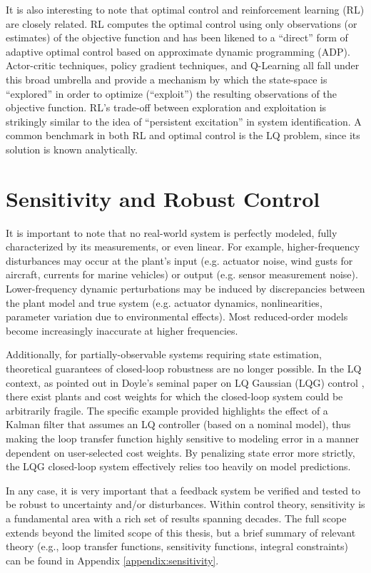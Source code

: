 It is also interesting to note that optimal control and reinforcement learning (RL) are closely related.  RL computes the optimal control using only observations (or estimates) of the objective function and has been likened to a ``direct'' \cite{slotineli} form of adaptive optimal control \cite{sutton1992reinforcement} based on approximate dynamic programming (ADP).  Actor-critic techniques, policy gradient techniques, and Q-Learning all fall under this broad umbrella and provide a mechanism by which the state-space is ``explored'' in order to optimize (``exploit'') the resulting observations of the objective function.  RL's trade-off between exploration and exploitation is strikingly similar to the idea of ``persistent excitation'' in system identification.  A common benchmark in both RL and optimal control is the LQ problem, since its solution is known analytically.

\section{Sensitivity and Robust Control}
\label{chap:introRobustnessAnalysis}
It is important to note that no real-world system is perfectly modeled, fully characterized by its measurements, or even linear.  For example, higher-frequency disturbances may occur at the plant's input (e.g. actuator noise, wind gusts for aircraft, currents for marine vehicles) or output (e.g. sensor measurement noise).  Lower-frequency dynamic perturbations may be induced by discrepancies between the plant model and true system (e.g. actuator dynamics, nonlinearities, parameter variation due to environmental effects).  Most reduced-order models become increasingly inaccurate at higher frequencies.

Additionally, for partially-observable systems requiring state estimation, theoretical guarantees of closed-loop robustness are no longer possible.  In the LQ context, as pointed out in Doyle's seminal paper on LQ Gaussian (LQG) control \cite{doyle1978guaranteed}, there exist plants and cost weights for which the closed-loop system could be arbitrarily fragile.  The specific example provided highlights the effect of a Kalman filter that assumes an LQ controller (based on a nominal model), thus making the loop transfer function highly sensitive to modeling error in a manner dependent on user-selected cost weights.  By penalizing state error more strictly, the LQG closed-loop system effectively relies too heavily on model predictions.

In any case, it is very important that a feedback system be verified and tested to be robust to uncertainty and/or disturbances.  Within control theory, sensitivity is a fundamental area with a rich set of results spanning decades.  The full scope extends beyond the limited scope of this thesis, but a brief summary of relevant theory (e.g., loop transfer functions, sensitivity functions, integral constraints) can be found in Appendix \ref{appendix:sensitivity}.

